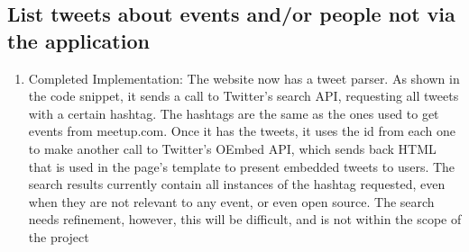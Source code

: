 \documentclass[draftclsnofoot,10pt,onecolumn]{IEEEtran} %
\begin{document}
\subsection{List tweets about events and/or people not via the application}
\begin{enumerate}[label*=\arabic*.]
  \item Completed Implementation: The website now has a tweet parser. As shown
    in the code snippet, it sends a call to Twitter's search API, requesting all
    tweets with a certain hashtag. The hashtags are the same as the ones used to
    get events from meetup.com. Once it has the tweets, it uses the id from each
    one to make another call to Twitter's OEmbed API, which sends back HTML that
    is used in the page's template to present embedded tweets to users.  The
    search results currently contain all instances of the hashtag requested,
    even when they are not relevant to any event, or even open source. The
    search needs refinement, however, this will be difficult, and is not within
    the scope of the project
\end{enumerate}
\end{document}
